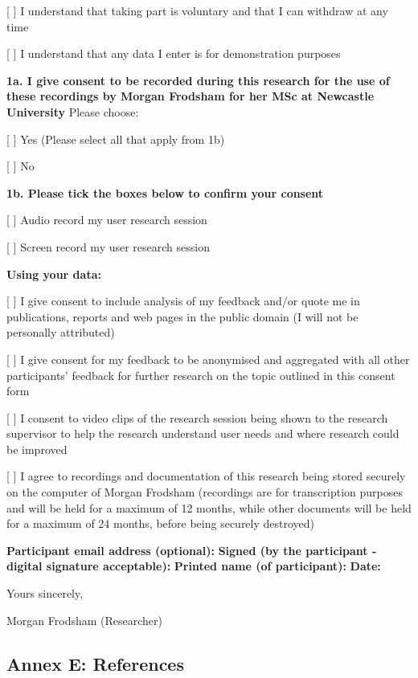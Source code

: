 \documentclass[
]{article}
\begin{document}
{[} {]} I understand that taking part is voluntary and that I can
withdraw at any time

{[} {]} I understand that any data I enter is for demonstration purposes

\textbf{1a. I give consent to be recorded during this research for the
use of these recordings by Morgan Frodsham for her MSc at Newcastle
University} Please choose:

{[} {]} Yes (Please select all that apply from 1b)

{[} {]} No

\textbf{1b. Please tick the boxes below to confirm your consent}

{[} {]} Audio record my user research session

{[} {]} Screen record my user research session

\textbf{Using your data:}

{[} {]} I give consent to include analysis of my feedback and/or quote
me in publications, reports and web pages in the public domain (I will
not be personally attributed)

{[} {]} I give consent for my feedback to be anonymised and aggregated
with all other participants' feedback for further research on the topic
outlined in this consent form

{[} {]} I consent to video clips of the research session being shown to
the research supervisor to help the research understand user needs and
where research could be improved

{[} {]} I agree to recordings and documentation of this research being
stored securely on the computer of Morgan Frodsham (recordings are for
transcription purposes and will be held for a maximum of 12 months,
while other documents will be held for a maximum of 24 months, before
being securely destroyed)

\textbf{Participant email address (optional):} \textbf{Signed (by the
participant - digital signature acceptable):} \textbf{Printed name (of
participant):} \textbf{Date:}

Yours sincerely,

Morgan Frodsham (Researcher)

\newpage

\hypertarget{annex-e-references}{%
\subsection*{Annex E: References}\label{annex-e-references}}
\end{document}
